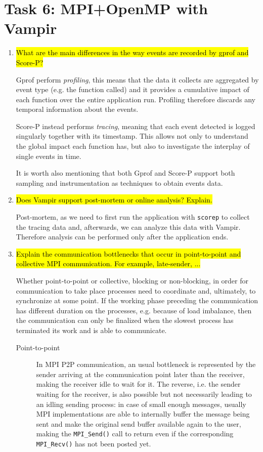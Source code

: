 \documentclass{article}
\begin{document}
\section{Task 6: MPI+OpenMP with Vampir}
\begin{enumerate}
	\item \hl{What are the main differences in the way events are recorded by gprof and Score-P?} ~

	Gprof perform \emph{profiling}, this means that the data it collects are aggregated by event type (e.g. the function called) and it provides a cumulative impact of each function over the entire application run. Profiling therefore discards any temporal information about the events.

	Score-P instead performs \emph{tracing}, meaning that each event detected is logged singularly together with its timestamp. This allows not only to understand the global impact each function has, but also to investigate the interplay of single events in time.

	It is worth also mentioning that both Gprof and Score-P support both sampling and instrumentation as techniques to obtain events data.

	\item \hl{Does Vampir support post-mortem or online analysis? Explain.} ~

	Post-mortem, as we need to first run the application with \verb!scorep! to collect the tracing data and, afterwards, we can analyze this data with Vampir. Therefore analysis can be performed only after the application ends.

	\item \hl{Explain the communication bottlenecks that occur in point-to-point and collective MPI communication. For example, late-sender, ...} ~

	Whether point-to-point or collective, blocking or non-blocking, in order for communication to take place processes need to coordinate and, ultimately, to synchronize at some point. If the working phase preceding the communication has different duration on the processes, e.g. because of load imbalance, then the communication can only be finalized when the slowest process has terminated its work and is able to communicate.

	\begin{description}
		\item[Point-to-point] In MPI P2P communication, an usual bottleneck is represented by the sender arriving at the communication point later than the receiver, making the receiver idle to wait for it. The reverse, i.e. the sender waiting for the receiver, 
		is also possible but not necessarily leading to an idling sending process:
		in case of small enough messages, usually MPI implementations are able to internally buffer the message being sent and make the original send buffer available again to the user, making the \verb!MPI_Send()! call to return even if the corresponding \verb!MPI_Recv()! has not been posted yet.


\end{description}
\end{enumerate}
\end{document}
